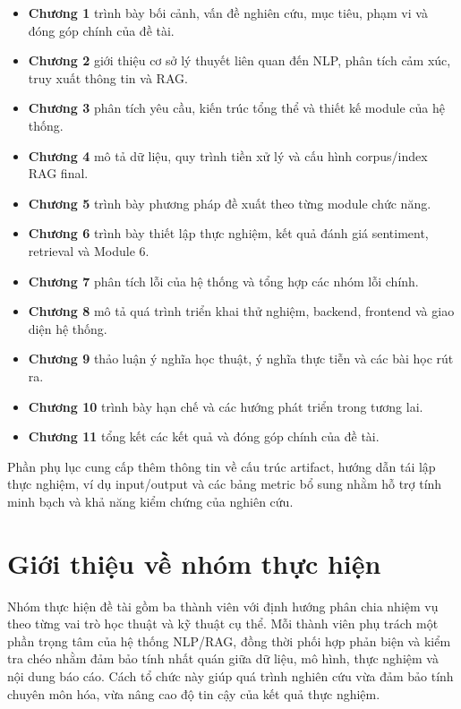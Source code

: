 \begin{itemize}
    \item \textbf{Chương 1} trình bày bối cảnh, vấn đề nghiên cứu, mục tiêu, phạm vi và đóng góp chính của đề tài.
    \item \textbf{Chương 2} giới thiệu cơ sở lý thuyết liên quan đến NLP, phân tích cảm xúc, truy xuất thông tin và RAG.
    \item \textbf{Chương 3} phân tích yêu cầu, kiến trúc tổng thể và thiết kế module của hệ thống.
    \item \textbf{Chương 4} mô tả dữ liệu, quy trình tiền xử lý và cấu hình corpus/index RAG final.
    \item \textbf{Chương 5} trình bày phương pháp đề xuất theo từng module chức năng.
    \item \textbf{Chương 6} trình bày thiết lập thực nghiệm, kết quả đánh giá sentiment, retrieval và Module 6.
    \item \textbf{Chương 7} phân tích lỗi của hệ thống và tổng hợp các nhóm lỗi chính.
    \item \textbf{Chương 8} mô tả quá trình triển khai thử nghiệm, backend, frontend và giao diện hệ thống.
    \item \textbf{Chương 9} thảo luận ý nghĩa học thuật, ý nghĩa thực tiễn và các bài học rút ra.
    \item \textbf{Chương 10} trình bày hạn chế và các hướng phát triển trong tương lai.
    \item \textbf{Chương 11} tổng kết các kết quả và đóng góp chính của đề tài.
\end{itemize}

Phần phụ lục cung cấp thêm thông tin về cấu trúc artifact, hướng dẫn tái lập thực nghiệm, ví dụ input/output và các bảng metric bổ sung nhằm hỗ trợ tính minh bạch và khả năng kiểm chứng của nghiên cứu.

\section{Giới thiệu về nhóm thực hiện}
Nhóm thực hiện đề tài gồm ba thành viên với định hướng phân chia nhiệm vụ theo từng vai trò học thuật và kỹ thuật cụ thể. Mỗi thành viên phụ trách một phần trọng tâm của hệ thống NLP/RAG, đồng thời phối hợp phản biện và kiểm tra chéo nhằm đảm bảo tính nhất quán giữa dữ liệu, mô hình, thực nghiệm và nội dung báo cáo. Cách tổ chức này giúp quá trình nghiên cứu vừa đảm bảo tính chuyên môn hóa, vừa nâng cao độ tin cậy của kết quả thực nghiệm.

